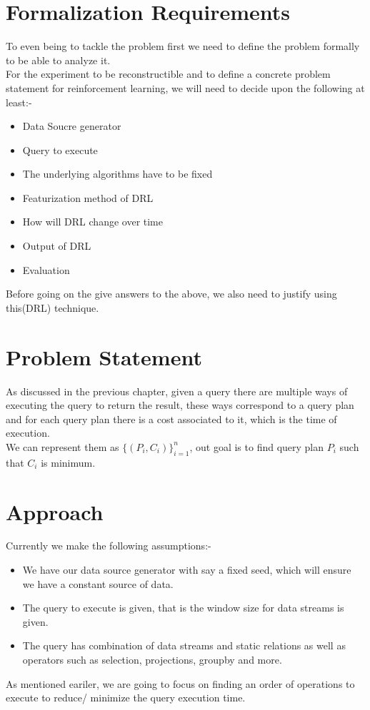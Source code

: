 \section{Formalization Requirements}
To even being to tackle the problem first we need to define the problem formally to be able to analyze it.
\\ For the experiment to be reconstructible and to define a concrete problem statement for reinforcement learning, we will need to decide upon the following at least:-
\begin{itemize}
    \item Data Soucre generator
    \item Query to execute
    \item The underlying algorithms have to be fixed
    \item Featurization method of DRL
    \item How will DRL change over time
    \item Output of DRL
    \item Evaluation
\end{itemize}
Before going on the give answers to the above, we also need to justify using this(DRL) technique.

\section{Problem Statement}
As discussed in the previous chapter, given a query there are multiple ways of executing the query to return the result, these ways correspond to a query plan and for each query plan there is a cost associated to it, which is the time of execution.\\
We can represent them as $\{(P_{i},C_{i})\}_{i=1}^{n}$, out goal is to find query plan $P_{i}$ such that $C_{i}$ is minimum.

\section{Approach}
Currently we make the following assumptions:-
\begin{itemize}
    \item We have our data source generator with say a fixed seed, which will ensure we have a constant source of data.
    \item The query to execute is given, that is the window size for data streams is given.
    \item The query has combination of data streams and static relations as well as operators such as selection, projections, groupby and more.
\end{itemize}
As mentioned eariler, we are going to focus on finding an order of operations to execute to reduce/ minimize the query execution time.

